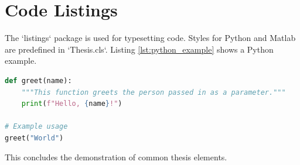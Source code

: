 \section{Code Listings}
\label{sec:code}

The `listings` package is used for typesetting code. Styles for Python and Matlab are predefined in `Thesis.cls`.
Listing \ref{lst:python_example} shows a Python example.

\begin{lstlisting}[language=Python, caption={A simple Python function.}, label={lst:python_example}]
def greet(name):
    """This function greets the person passed in as a parameter."""
    print(f"Hello, {name}!")

# Example usage
greet("World")
\end{lstlisting}

This concludes the demonstration of common thesis elements.